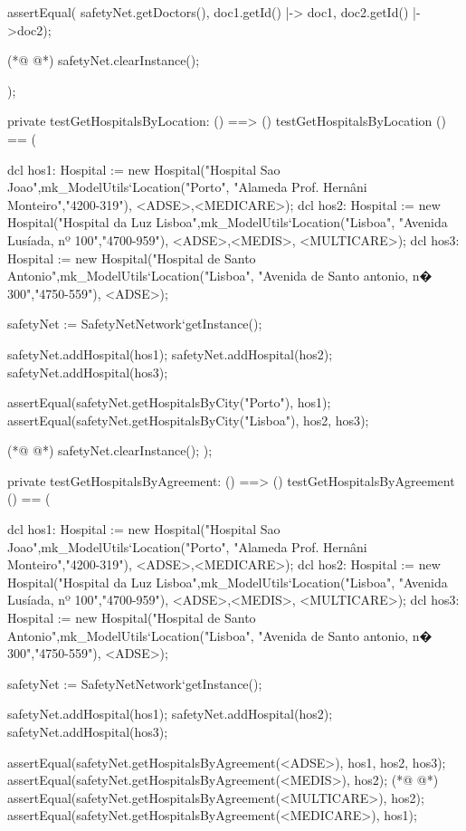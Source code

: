 \begin{vdmpp}[breaklines=true]
  assertEqual( safetyNet.getDoctors(), {doc1.getId() |-> doc1, doc2.getId() |->doc2});
  
(*@
\label{testGetHospitalsById:355}
@*)
  safetyNet.clearInstance();
    
);

private testGetHospitalsByLocation: () ==> ()
 testGetHospitalsByLocation () == (
   
  dcl hos1: Hospital := new Hospital("Hospital Sao Joao",mk_ModelUtils`Location("Porto", "Alameda Prof. Hernâni Monteiro","4200-319"), {<ADSE>,<MEDICARE>});
  dcl hos2: Hospital := new Hospital("Hospital da Luz Lisboa",mk_ModelUtils`Location("Lisboa", "Avenida Lusíada, nº 100","4700-959"), {<ADSE>,<MEDIS>, <MULTICARE>});
  dcl hos3: Hospital := new Hospital("Hospital de Santo Antonio",mk_ModelUtils`Location("Lisboa", "Avenida de Santo antonio, n� 300","4750-559"), {<ADSE>});
  
  safetyNet := SafetyNetNetwork`getInstance();
   
  safetyNet.addHospital(hos1);
  safetyNet.addHospital(hos2);
  safetyNet.addHospital(hos3);
 
  assertEqual(safetyNet.getHospitalsByCity("Porto"), {hos1});
  assertEqual(safetyNet.getHospitalsByCity("Lisboa"), {hos2, hos3});
 
(*@
\label{testGetAllHospitals:375}
@*)
  safetyNet.clearInstance();
);

private testGetHospitalsByAgreement: () ==> ()
 testGetHospitalsByAgreement () == (
   
  dcl hos1: Hospital := new Hospital("Hospital Sao Joao",mk_ModelUtils`Location("Porto", "Alameda Prof. Hernâni Monteiro","4200-319"), {<ADSE>,<MEDICARE>});
  dcl hos2: Hospital := new Hospital("Hospital da Luz Lisboa",mk_ModelUtils`Location("Lisboa", "Avenida Lusíada, nº 100","4700-959"), {<ADSE>,<MEDIS>, <MULTICARE>});
  dcl hos3: Hospital := new Hospital("Hospital de Santo Antonio",mk_ModelUtils`Location("Lisboa", "Avenida de Santo antonio, n� 300","4750-559"), {<ADSE>});
  
  safetyNet := SafetyNetNetwork`getInstance();
   
  safetyNet.addHospital(hos1);
  safetyNet.addHospital(hos2);
  safetyNet.addHospital(hos3);
 
  assertEqual(safetyNet.getHospitalsByAgreement(<ADSE>), {hos1, hos2, hos3});
  assertEqual(safetyNet.getHospitalsByAgreement(<MEDIS>), {hos2});
(*@
\label{testGetHospitalsByName:393}
@*)
  assertEqual(safetyNet.getHospitalsByAgreement(<MULTICARE>), {hos2});
  assertEqual(safetyNet.getHospitalsByAgreement(<MEDICARE>), {hos1});
  

\end{vdmpp}

